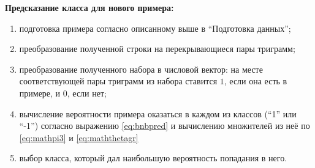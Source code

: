 \begin{samepage}
  \textbf{Предсказание класса для нового примера:}
  \begin{enumerate}
  \item подготовка примера согласно описанному выше в ``Подготовка данных'';
  \item преобразование полученной строки на перекрывающиеся пары триграмм;
  \item преобразование полученного набора в числовой вектор: на месте соответствующей
    пары триграмм из набора ставится $1$, если она есть в примере, и $0$, если нет;
  \item вычисление вероятности примера оказаться в каждом из классов (``1'' или ``-1'') согласно выражению
    \ref{eq:bnbpred} и вычислению множителей из неё по \ref{eq:mathpi3} и \ref{eq:maththetagr}
  \item выбор класса, который дал наибольшую вероятность попадания в него.
  \end{enumerate}
\end{samepage}
